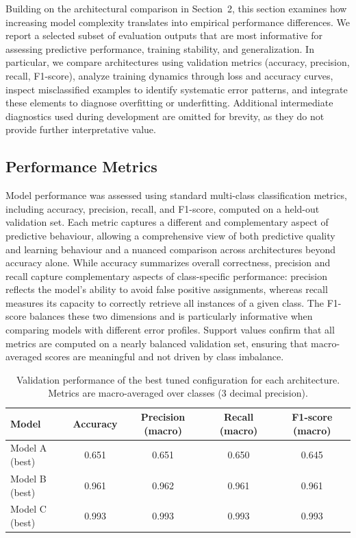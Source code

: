 \documentclass{article}
\begin{document}
Building on the architectural comparison in Section~2, this section
examines how increasing model complexity translates into empirical
performance differences. We report a selected subset of evaluation
outputs that are most informative for assessing predictive performance,
training stability, and generalization. In particular, we compare
architectures using validation metrics (accuracy, precision, recall,
F1-score), analyze training dynamics through loss and accuracy curves,
inspect misclassified examples to identify systematic error patterns,
and integrate these elements to diagnose overfitting or underfitting.
Additional intermediate diagnostics used during development are omitted
for brevity, as they do not provide further interpretative value.

\subsection{Performance Metrics}

Model performance was assessed using standard multi-class classification
metrics, including accuracy, precision, recall, and F1-score, computed
on a held-out validation set. Each metric captures a different and
complementary aspect of predictive behaviour, allowing a comprehensive
view of both predictive quality and learning behaviour and a nuanced
comparison across architectures beyond accuracy alone. While
accuracy summarizes overall correctness, precision and recall capture
complementary aspects of class-specific performance: precision reflects
the model's ability to avoid false positive assignments, whereas recall
measures its capacity to correctly retrieve all instances of a given
class. The F1-score balances these two dimensions and is particularly
informative when comparing models with different error profiles. Support
values confirm that all metrics are computed on a nearly balanced
validation set, ensuring that macro-averaged scores are meaningful and
not driven by class imbalance.

\begin{table}[h]
\centering
\caption{Validation performance of the best tuned configuration for each architecture. Metrics are macro-averaged over classes (3 decimal precision).}
\label{tab:validation_performance}
\begin{tabular}{lcccc}
\hline
Model & Accuracy & Precision (macro) & Recall (macro) & F1-score (macro) \\
\hline
Model A (best) & 0.651 & 0.651 & 0.650 & 0.645 \\
Model B (best) & 0.961 & 0.962 & 0.961 & 0.961 \\
Model C (best) & 0.993 & 0.993 & 0.993 & 0.993 \\
\hline
\end{tabular}
\end{table}
\end{document}
